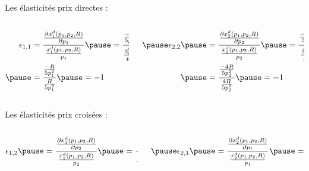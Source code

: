 \documentclass[9pt,handout,professionalfonts,hyperref]{beamer}
\begin{document}
\begin{frame}

	Les élasticités prix directes :\newline

	\begin{columns}
		\begin{column}{0.5\textwidth}
			\large
			\[\begin{aligned}
			\epsilon_{1,1}
			&= \frac{\frac{\partial x_1^d(p_1,p_2,R)}{\partial p_1}}{\frac{x_1^d(p_1,p_2,R) }{p_1}} \pause= \frac{\frac{-R}{5p_1^2}}{\frac{\frac{R}{5p_1}}{p_1}} \\
			\pause&= \frac{\frac{-R}{5p_1^2}}{\frac{R}{5p_1^2}}\pause= -1
			\end{aligned}\]
		\end{column}
		\begin{column}{0.5\textwidth}
			\large
			\[\begin{aligned}
			\pause 	\epsilon_{2,2}
			\pause 	&= \frac{\frac{\partial x_2^d(p_1,p_2,R)}{\partial p_2}}{\frac{x_2^d(p_1,p_2,R) }{p_2}} \pause= \frac{\frac{-4R}{5p_2^2}}{\frac{\frac{4R}{5p_2}}{p_2}} \\
			\pause&= \frac{\frac{-4R}{5p_2^2}}{\frac{4R}{5p_2^2}}\pause= -1
			\end{aligned}\]
		\end{column}
	\end{columns}

	\bigskip

	Les élasticités prix croisées  :\newline

	\begin{columns}
		\begin{column}{0.5\textwidth}
			\large
			\[\begin{aligned}
			\epsilon_{1,2}
			\pause 	&= \frac{\frac{\partial x_1^d(p_1,p_2,R)}{\partial p_2}}{\frac{x_1^d(p_1,p_2,R) }{p_2}} \pause= \frac{0}{\frac{\frac{R}{5p_1}}{p_2}} = 0
          \end{aligned}\]
		\end{column}
		\begin{column}{0.5\textwidth}
			\large
			\[\begin{aligned}
			\pause 		\epsilon_{2,1}
			\pause 		&= \frac{\frac{\partial x_2^d(p_1,p_2,R)}{\partial p_1}}{\frac{x_2^d(p_1,p_2,R) }{p_1}} \pause= \frac{0}{\frac{\frac{4R}{5p_2}}{p_2}} = 0
			\end{aligned}\]
		\end{column}
	\end{columns}

  \end{frame}
\end{document}
